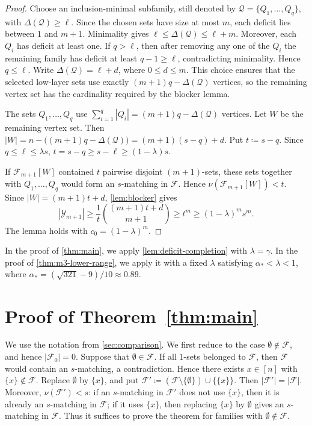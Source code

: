 \documentclass[10pt,a4paper]{article}
\numberwithin{equation}{section}
\theoremstyle{definition}
\newcommand{\F}{\mathcal F}
\newcommand{\Y}{\mathcal Y}
\begin{document}
\begin{proof}
    Choose an inclusion-minimal subfamily, still denoted by
    \(\mathcal Q=\{Q_1,\ldots,Q_q\}\), with \(\Delta(\mathcal Q)\ge \ell\).  Since the
    chosen sets have size at most \(m\), each deficit lies between \(1\) and
    \(m+1\).  Minimality gives \(\ell\le \Delta(\mathcal Q)\le \ell+m\).  Moreover,
    each \(Q_i\) has deficit at least one.  If \(q>\ell\), then after removing
    any one of the \(Q_i\) the remaining family has deficit at least
    \(q-1\ge\ell\), contradicting minimality.  Hence \(q\le\ell\).  Write
    \(\Delta(\mathcal Q)=\ell+d\), where \(0\le d\le m\).
    This choice ensures that the selected low-layer sets use exactly
    \((m+1)q-\Delta(\mathcal Q)\) vertices, so the remaining vertex set has the cardinality
    required by the blocker lemma.

    The sets \(Q_1,\ldots,Q_q\) use
    \(\sum_{i=1}^q |Q_i|=(m+1)q-\Delta(\mathcal Q)\)
    vertices.  Let \(W\) be the remaining vertex set.  Then
    \(|W|=n-\bigl((m+1)q-\Delta(\mathcal Q)\bigr) =(m+1)(s-q)+d.\)
    Put \(t\coloneqq s-q\).  Since \(q\le\ell\le\lambda s\),
    \(t=s-q\ge s-\ell\ge(1-\lambda)s.\)

    If \(\F_{m+1}[W]\) contained \(t\) pairwise disjoint \((m+1)\)-sets,
    these sets together with \(Q_1,\ldots,Q_q\) would form an \(s\)-matching in
    \(\F\).  Hence \(\nu(\F_{m+1}[W])<t\).  Since \(|W|=(m+1)t+d\),
    \cref{lem:blocker} gives
    \[
        |\Y_{m+1}|
        \ge
        \frac1t\binom{(m+1)t+d}{m+1}
        \ge t^m
        \ge (1-\lambda)^m s^m.
    \]
    The lemma holds with \(c_0=(1-\lambda)^m\).
\end{proof}

In the proof of \cref{thm:main}, we apply
\cref{lem:deficit-completion} with \(\lambda=\gamma\).  In the proof of
\cref{thm:m3-lower-range}, we apply it with a fixed \(\lambda\) satisfying
\(\alpha_*<\lambda<1\), where \(\alpha_*=(\sqrt{321}-9)/10\approx 0.89\).

\section{Proof of Theorem~\ref{thm:main}}\label{sec:proof-of-main-result-1}

We use the notation from \cref{sec:comparison}.
We first reduce to the case \(\emptyset\notin\F\), and hence
\(|\F_0|=0\).  Suppose that \(\emptyset\in\F\).
If all $1$-sets belonged to \(\F\), then \(\F\) would contain an $s$-matching, a contradiction.
Hence there exists \(x\in[n]\) with \(\{x\}\notin\F\).  Replace \(\emptyset\) by \(\{x\}\), and put
\(\F'\coloneqq(\F\setminus\{\emptyset\})\cup\{\{x\}\}.\)
Then \(|\F'|=|\F|\).  Moreover, \(\nu(\F')<s\): if an \(s\)-matching in
\(\F'\) does not use \(\{x\}\), then it is already an \(s\)-matching in
\(\F\); if it uses \(\{x\}\), then replacing \(\{x\}\) by \(\emptyset\) gives
an \(s\)-matching in \(\F\).  Thus it suffices to prove the theorem for
families with \(\emptyset\notin\F\).
\end{document}
